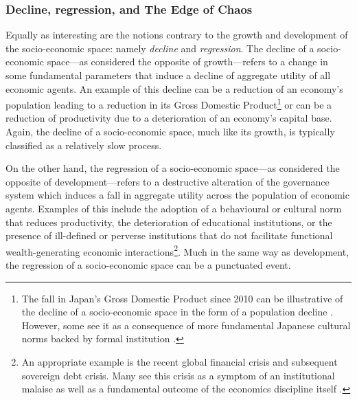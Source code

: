 \subsubsection{Decline, regression, and The Edge of Chaos}

Equally as interesting are the notions contrary to the growth and development of the socio-economic space: namely \emph{decline} and \emph{regression}. The decline of a socio-economic space---as considered the opposite of growth---refers to a change in some fundamental parameters that induce a decline of aggregate utility of all economic agents. An example of this decline can be a reduction of an economy's population leading to a reduction in its Gross Domestic Product\footnote{The fall in Japan's Gross Domestic Product since 2010 can be illustrative of the decline of a socio-economic space in the form of a population decline \citep{Economist2014}. However, some see it as a consequence of more fundamental Japanese cultural norms backed by formal institution \citep{West2011}.} or can be a reduction of productivity due to a deterioration of an economy's capital base. Again, the decline of a socio-economic space, much like its growth, is typically classified as a relatively slow process.

On the other hand, the regression of a socio-economic space---as considered the opposite of development---refers to a destructive alteration of the governance system which induces a fall in aggregate utility across the population of economic agents. Examples of this include the adoption of a behavioural or cultural norm that reduces productivity, the deterioration of educational institutions, or the presence of ill-defined or perverse institutions that do not facilitate functional wealth-generating economic interactions\footnote{An appropriate example is the recent global financial crisis and subsequent sovereign debt crisis. Many see this crisis as a symptom of an institutional malaise \citep{Crotty2009, Ferguson2014} as well as a fundamental outcome of the economics discipline itself \citep{Hodgson2008, Hodgson2009, Krugman2009}.}. Much in the same way as development, the regression of a socio-economic space can be a punctuated event.

